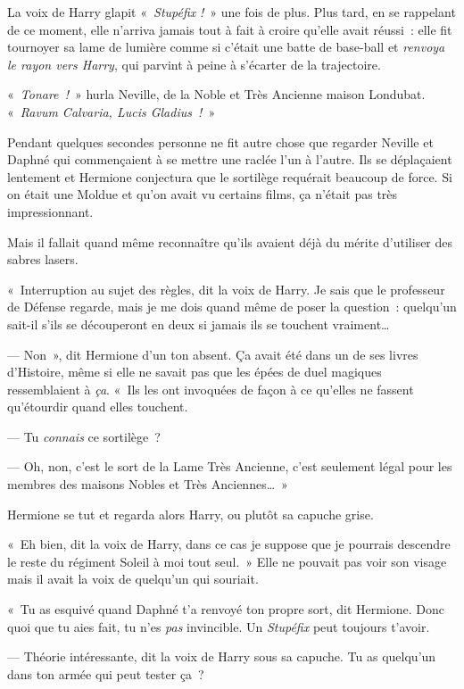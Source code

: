 La voix de Harry glapit «~\emph{Stupéfix} \emph{!}~» une fois de plus.
Plus tard, en se rappelant de ce moment, elle n'arriva jamais tout à fait à croire qu'elle avait réussi~: elle fit tournoyer sa lame de lumière comme si c'était une batte de base-ball et \emph{renvoya le rayon vers Harry}, qui parvint à peine à s'écarter de la trajectoire.

«~\emph{Tonare~!}~» hurla Neville, de la Noble et Très Ancienne maison Londubat.
«~\emph{Ravum Calvaria, Lucis Gladius~!}~»

\later

Pendant quelques secondes personne ne fit autre chose que regarder Neville et Daphné qui commençaient à se mettre une raclée l'un à l'autre.
Ils se déplaçaient lentement et Hermione conjectura que le sortilège requérait beaucoup de force.
Si on était une Moldue et qu'on avait vu certains films, ça n'était pas très impressionnant.

Mais il fallait quand même reconnaître qu'ils avaient déjà du mérite d'utiliser des sabres lasers.

«~Interruption au sujet des règles, dit la voix de Harry.
Je sais que le professeur de Défense regarde, mais je me dois quand même de poser la question~: quelqu'un sait-il s'ils se découperont en deux si jamais ils se touchent vraiment…

--- Non~», dit Hermione d'un ton absent.
Ça avait été dans un de ses livres d'Histoire, même si elle ne savait pas que les épées de duel magiques ressemblaient à \emph{ça}.
«~Ils les ont invoquées de façon à ce qu'elles ne fassent qu'étourdir quand elles touchent.

--- Tu \emph{connais} ce sortilège~?

--- Oh, non, c'est le sort de la Lame Très Ancienne, c'est seulement légal pour les membres des maisons Nobles et Très Anciennes…~»

Hermione se tut et regarda alors Harry, ou plutôt sa capuche grise.

«~Eh bien, dit la voix de Harry, dans ce cas je suppose que je pourrais descendre le reste du régiment Soleil à moi tout seul.~»
Elle ne pouvait pas voir son visage mais il avait la voix de quelqu'un qui souriait.

«~Tu as esquivé quand Daphné t'a renvoyé ton propre sort, dit Hermione.
Donc quoi que tu aies fait, tu n'es \emph{pas} invincible.
Un \emph{Stupéfix} peut toujours t'avoir.

--- Théorie intéressante, dit la voix de Harry sous sa capuche.
Tu as quelqu'un dans ton armée qui peut tester ça~?

